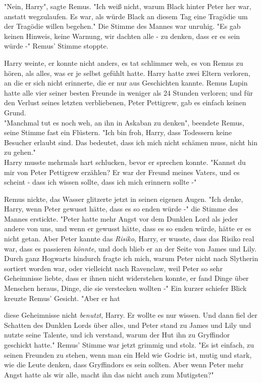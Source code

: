 {"Nein, Harry", sagte Remus. "Ich weiß nicht, warum Black hinter Peter her war, anstatt wegzulaufen. Es war, als würde Black an diesem Tag eine Tragödie um der Tragödie willen begehen." Die Stimme des Mannes war unruhig. "Es gab keinen Hinweis, keine Warnung, wir dachten alle - zu denken, dass er es sein würde -" Remus' Stimme stoppte.

Harry weinte, er konnte nicht anders, es tat schlimmer weh, es von Remus zu hören, als alles, was er je selbst gefühlt hatte. Harry hatte zwei Eltern verloren, an die er sich nicht erinnerte, die er nur aus Geschichten kannte. Remus Lupin hatte alle vier seiner besten Freunde in weniger als 24 Stunden verloren; und für den Verlust seines letzten verbliebenen, Peter Pettigrew, gab es einfach keinen Grund.\\ "Manchmal tut es noch weh, an ihn in Askaban zu denken", beendete Remus, seine Stimme fast ein Flüstern. "Ich bin froh, Harry, dass Todessern keine Besucher erlaubt sind. Das bedeutet, dass ich mich nicht schämen muss, nicht hin zu gehen."\\ Harry musste mehrmals hart schlucken, bevor er sprechen konnte. "Kannst du mir von Peter Pettigrew erzählen? Er war der Freund meines Vaters, und es scheint - dass ich wissen sollte, dass ich mich erinnern sollte -"

Remus nickte, das Wasser glitzerte jetzt in seinen eigenen Augen. "Ich denke, Harry, wenn Peter gewusst hätte, dass es so enden würde -" die Stimme des Mannes erstickte. "Peter hatte mehr Angst vor dem Dunklen Lord als jeder andere von uns, und wenn er gewusst hätte, dass es so enden würde, hätte er es nicht getan. Aber Peter kannte das \emph{Risiko}, Harry, er wusste, dass das Risiko real war, dass es passieren \emph{könnte}, und doch blieb er an der Seite von James und Lily. Durch ganz Hogwarts hindurch fragte ich mich, warum Peter nicht nach Slytherin sortiert worden war, oder vielleicht nach Ravenclaw, weil Peter so sehr Geheimnisse liebte, dass er ihnen nicht widerstehen konnte, er fand Dinge über Menschen heraus, Dinge, die sie verstecken wollten -" Ein kurzer schiefer Blick kreuzte Remus' Gesicht. "Aber er hat

diese Geheimnisse nicht \emph{benutzt}, Harry. Er wollte es nur wissen. Und dann fiel der Schatten des Dunklen Lords über alles, und Peter stand zu James und Lily und nutzte seine Talente, und ich verstand, warum der Hut ihn zu Gryffindor geschickt hatte." Remus' Stimme war jetzt grimmig und stolz. "Es ist einfach, zu seinen Freunden zu stehen, wenn man ein Held wie Godric ist, mutig und stark, wie die Leute denken, dass Gryffindors es sein sollten. Aber wenn Peter mehr Angst hatte als wir alle, macht ihn das nicht auch zum Mutigsten?"

}
